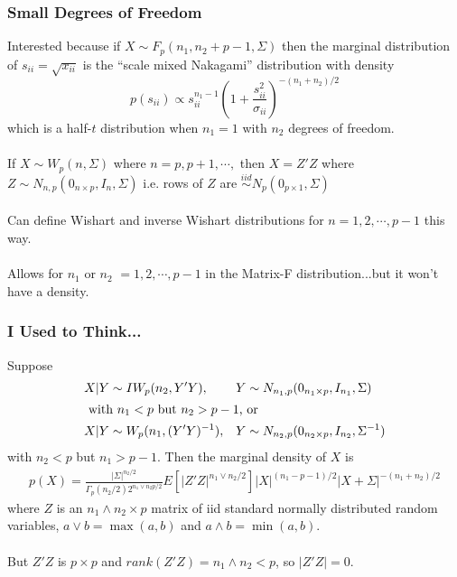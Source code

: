 \documentclass[xcolor=dvipsnames]{beamer}
\begin{document}
\begin{frame}
\frametitle{Small Degrees of Freedom}
Interested because if $X\sim F_p(n_1, n_2 + p - 1, \Sigma)$ then the marginal distribution of $s_{ii}=\sqrt{x_{ii}}$ is the ``scale mixed Nakagami'' distribution with density
  \[
    p(s_{ii})\propto s_{ii}^{n_1 - 1}\left(1 + \frac{s_{ii}^2}{\sigma_{ii}}\right)^{-(n_1 + n_2)/2}
  \]
which is a half-$t$ distribution when $n_1=1$ with $n_2$ degrees of freedom.\\~\\
\pause
If $X\sim W_p(n,\Sigma)$ where $n=p,p+1,\cdots,$ then $X=Z'Z$ where $Z\sim N_{n,p}(0_{n\times p},I_n,\Sigma)$ i.e. rows of $Z$ are $\stackrel{iid}{\sim} N_p(0_{p\times 1},\Sigma)$\\~\\
\pause
Can define Wishart and inverse Wishart distributions for $n=1,2,\cdots,p-1$ this way.\\~\\
\pause
Allows for $n_1$ or $n_2$ $=1,2,\cdots,p-1$ in the Matrix-F distribution...\pause but it won't have a density.
\end{frame}

\begin{frame}
\frametitle{I Used to Think...}
Suppose 
\begin{align*}
&X|Y \sim IW_p(n_2,Y'Y),&& Y\sim N_{n_1,p}(0_{n_1\times p}, I_{n_1}, \Sigma)\\
\intertext{ with $n_1 < p$ but $n_2 > p - 1$, or }
&X|Y \sim W_p(n_1,(Y'Y)^{-1}),&& Y\sim N_{n_2,p}(0_{n_2\times p}, I_{n_2}, \Sigma^{-1})
\end{align*}
 with $n_2 < p$ but $n_1 > p - 1$. \pause Then the marginal density of $X$ is
  \begin{align*}
    p(X) = \frac{|\Sigma|^{n_2/2}}{\Gamma_p(n_2/2)2^{n_1\vee n_2p/2}}E[|Z'Z|^{n_1\vee n_2/2}]|X|^{(n_1 - p - 1)/2}|X + \Sigma|^{-(n_1 + n_2)/2}
  \end{align*}
  where $Z$ is an $n_1\wedge n_2\times p$ matrix of iid standard normally distributed random variables, $a\vee b=\max(a,b)$ and $a\wedge b=\min(a,b)$.\\~\\
\pause
{\color{blue}But $Z'Z$ is $p\times p$ and $rank(Z'Z)=n_1\wedge n_2 <p$, so $|Z'Z|=0$.}
\end{frame}
\end{document}
